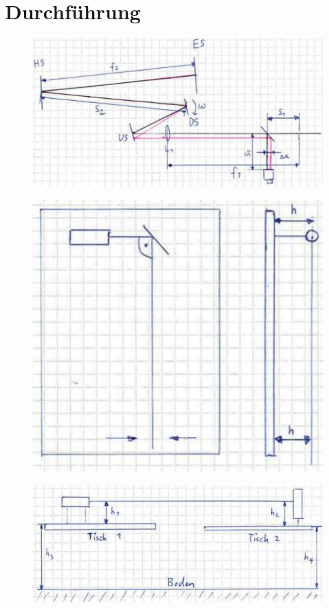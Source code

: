 \section{Durchf\"uhrung}

\begin{figure}[H]
    \center
    \includegraphics[width=\textwidth]{images/setup.pdf}
    \caption{}
    \label{fig:setup}
\end{figure}

\begin{figure}[H]
    \center
    \includegraphics[width=.5\textwidth]{images/laser-angle.pdf}
    \caption{}
    \label{fig:laser-angle}
\end{figure}

\begin{figure}[H]
    \center
    \includegraphics[width=.8\textwidth]{images/laser-height.pdf}
    \caption{}
    \label{fig:laser-height}
\end{figure}

